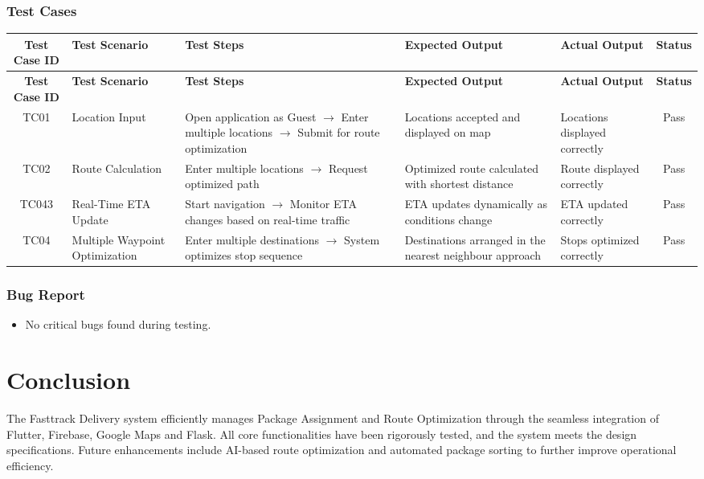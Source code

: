 \documentclass{article}
\begin{document}
\subsubsection{Test Cases}
\small
\setlength\LTleft{0pt}
\setlength\LTright{0pt}
\begin{longtable}{|c|p{2.8cm}|p{4cm}|p{2.8cm}|p{2.8cm}|c|}
\hline
\textbf{Test Case ID} & \textbf{Test Scenario} & \textbf{Test Steps} & \textbf{Expected Output} & \textbf{Actual Output} & \textbf{Status} \\
\hline
\endfirsthead
\hline
\textbf{Test Case ID} & \textbf{Test Scenario} & \textbf{Test Steps} & \textbf{Expected Output} & \textbf{Actual Output} & \textbf{Status} \\
\hline
\endhead
TC01 & Location Input & Open application as Guest $\rightarrow$ Enter multiple locations $\rightarrow$ Submit for route optimization & Locations accepted and displayed on map & Locations displayed correctly & Pass \\
\hline
TC02 & Route Calculation & Enter multiple locations $\rightarrow$ Request optimized path & Optimized route calculated with shortest distance & Route displayed correctly & Pass \\
\hline
TC043 & Real-Time ETA Update & Start navigation $\rightarrow$ Monitor ETA changes based on real-time traffic & ETA updates dynamically as conditions change & ETA updated correctly & Pass \\
\hline
TC04 & Multiple Waypoint Optimization & Enter multiple destinations $\rightarrow$ System optimizes stop sequence & Destinations arranged in the nearest neighbour approach & Stops optimized correctly & Pass \\
\hline
\end{longtable}

\subsubsection{Bug Report}
\begin{itemize}
    \item No critical bugs found during testing.
\end{itemize}

\section{Conclusion}
The Fasttrack Delivery system efficiently manages Package Assignment and Route Optimization through the seamless integration of Flutter, Firebase, Google Maps and Flask. All core functionalities have been rigorously tested, and the system meets the design specifications. Future enhancements include AI-based route optimization and automated package sorting to further improve operational efficiency.
\end{document}
